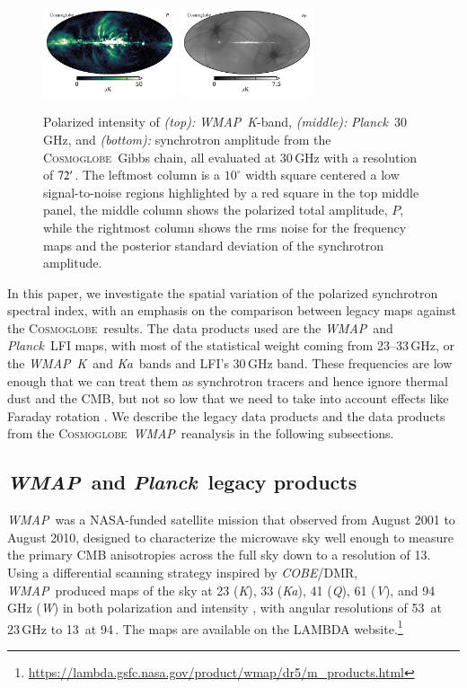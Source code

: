 \documentclass[twocolumn]{../../common/aa}
\def\WMAP{\emph{WMAP}}
\def\COBE{\emph{COBE}}
\def\Planck{\emph{Planck}}
\newcommand{\cosmoglobe}{\textsc{Cosmoglobe}}
\newcommand{\K}[0]{\textit K}
\newcommand{\Ka}[0]{\textit{Ka}}
\newcommand{\Q}[0]{\textit Q}
\newcommand{\V}[0]{\textit V}
\newcommand{\W}[0]{\textit W}
\begin{document}
\begin{figure}
	\includegraphics[width=0.35\textwidth]{figures/polint_CG.pdf}
	\includegraphics[width=0.35\textwidth]{figures/polint_CG_sigma.pdf}
	\caption{
		Polarized intensity of \textit{(top):} \WMAP\ \K-band, \textit{(middle):} \Planck\ 30\,GHz, and \textit{(bottom):} synchrotron amplitude from the \cosmoglobe\ Gibbs chain, all evaluated at 30\,GHz with a resolution of $72\arcm$. The leftmost column is a $10^\circ$ width square centered a low signal-to-noise regions highlighted by a red square in the top middle panel, the middle column shows the polarized total amplitude, $P$, while the rightmost column shows the rms noise for the frequency maps and the posterior standard deviation of the synchrotron amplitude.
		}
       \label{fig:synch_polint}
\end{figure}

In this paper, we investigate the spatial variation of the polarized synchrotron spectral index, with an emphasis on the comparison between  legacy maps against the \cosmoglobe\ results. The data products used are the \WMAP\ and \Planck\ LFI maps, with most of the statistical weight coming from 23--33\,GHz, or the \WMAP\ \K\ and \Ka\ bands and LFI's 30\,GHz band. These frequencies are low enough that we can treat them as synchrotron tracers and hence ignore thermal dust and the CMB, but not so low that we need to take into account effects like Faraday rotation \citep{fuskeland:2019}. We describe the legacy data products and the data products from the \cosmoglobe\ \WMAP\ reanalysis in the following subsections.


\subsection{\WMAP\ and \Planck\ legacy products}
\label{sec:wmap_data}

\WMAP\ was a NASA-funded satellite mission that observed from August 2001 to August 2010, designed to characterize the microwave sky well enough to measure the primary CMB anisotropies across the full sky down to a resolution of 13\arcm. Using a differential scanning strategy inspired by \COBE/DMR,
\WMAP\ produced maps of the sky at 23 (\K), 33 (\Ka), 41 (\Q), 61 (\V), and 94\,GHz (\W) in both polarization and intensity \citep{bennett2012}, with angular resolutions of 53\arcm\ at 23\,GHz to 13\arcm\ at 94\,\GHz. 
The maps are available on the LAMBDA website.\footnote{\url{https://lambda.gsfc.nasa.gov/product/wmap/dr5/m_products.html}} 
\end{document}
